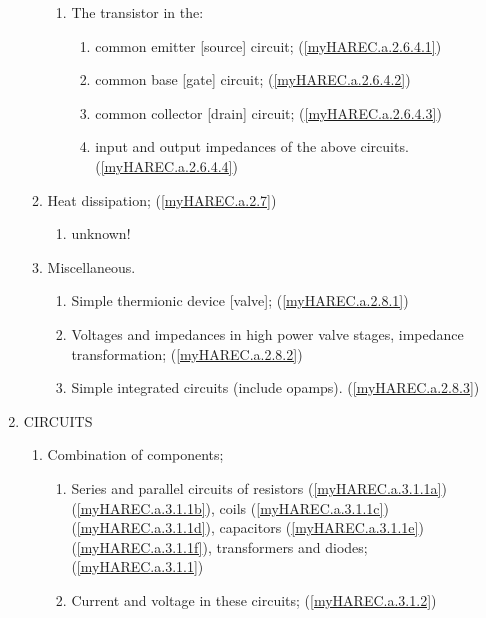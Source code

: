 \begin{enumerate}
\begin{enumerate}[noitemsep]
\begin{enumerate}[noitemsep]
\item The transistor in the:
\begin{enumerate}[noitemsep]
\item common emitter [source] circuit; (\ref{myHAREC.a.2.6.4.1})\label{HAREC.a.2.6.4.1}
\item common base [gate] circuit; (\ref{myHAREC.a.2.6.4.2})\label{HAREC.a.2.6.4.2}
\item common collector [drain] circuit; (\ref{myHAREC.a.2.6.4.3})\label{HAREC.a.2.6.4.3}
\item input and output impedances of the above circuits. (\ref{myHAREC.a.2.6.4.4})\label{HAREC.a.2.6.4.4}
\end{enumerate}
\end{enumerate}
\item Heat dissipation; (\ref{myHAREC.a.2.7})\label{HAREC.a.2.7}
\begin{enumerate}[noitemsep]
\item unknown! 
\end{enumerate}
\item Miscellaneous.
\begin{enumerate}[noitemsep]
\item Simple thermionic device [valve]; (\ref{myHAREC.a.2.8.1})\label{HAREC.a.2.8.1}
\item Voltages and impedances in high power valve stages, impedance transformation; (\ref{myHAREC.a.2.8.2})\label{HAREC.a.2.8.2}
\item Simple integrated circuits (include opamps). (\ref{myHAREC.a.2.8.3})\label{HAREC.a.2.8.3}
\end{enumerate}
\end{enumerate}
\item CIRCUITS
\begin{enumerate}[noitemsep]
\item Combination of components;
\begin{enumerate}[noitemsep]
\item Series and parallel circuits of resistors (\ref{myHAREC.a.3.1.1a})\label{HAREC.a.3.1.1a} (\ref{myHAREC.a.3.1.1b})\label{HAREC.a.3.1.1b}, coils (\ref{myHAREC.a.3.1.1c})\label{HAREC.a.3.1.1c} (\ref{myHAREC.a.3.1.1d})\label{HAREC.a.3.1.1d}, capacitors (\ref{myHAREC.a.3.1.1e})\label{HAREC.a.3.1.1e} (\ref{myHAREC.a.3.1.1f})\label{HAREC.a.3.1.1f}, transformers and diodes; (\ref{myHAREC.a.3.1.1})\label{HAREC.a.3.1.1}
\item Current and voltage in these circuits; (\ref{myHAREC.a.3.1.2})\label{HAREC.a.3.1.2}

\end{enumerate}
\end{enumerate}
\end{enumerate}
